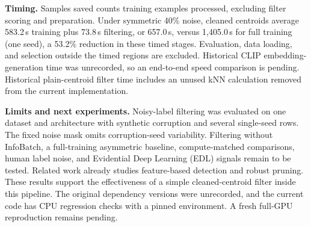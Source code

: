 \documentclass[10pt]{article}
\begin{document}
\textbf{Timing.} Samples saved counts training examples processed, excluding filter scoring and preparation. Under symmetric 40\% noise, cleaned centroids average 583.2\,s training plus 73.8\,s filtering, or 657.0\,s, versus 1{,}405.0\,s for full training (one seed), a 53.2\% reduction in these timed stages. Evaluation, data loading, and selection outside the timed regions are excluded. Historical CLIP embedding-generation time was unrecorded, so an end-to-end speed comparison is pending. Historical plain-centroid filter time includes an unused kNN calculation removed from the current implementation.

\textbf{Limits and next experiments.} Noisy-label filtering was evaluated on one dataset and architecture with synthetic corruption and several single-seed rows. The fixed noise mask omits corruption-seed variability. Filtering without InfoBatch, a full-training asymmetric baseline, compute-matched comparisons, human label noise, and Evidential Deep Learning (EDL) signals remain to be tested. Related work already studies feature-based detection and robust pruning. These results support the effectiveness of a simple cleaned-centroid filter inside this pipeline. The original dependency versions were unrecorded, and the current code has CPU regression checks with a pinned environment. A fresh full-GPU reproduction remains pending.
\end{document}
